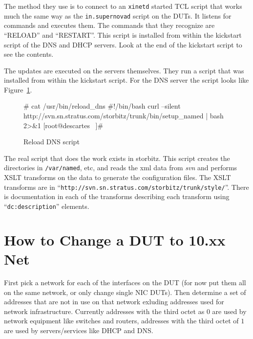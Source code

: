 \documentclass[twoside]{article}
\begin{document}
The method they use is to connect to an \verb+xinetd+ started TCL
script that works much the same way as the \verb+in.supernovad+ 
script on the DUTs.
It listens for commands and executes them.  The commands that
they recognize are ``RELOAD'' and ``RESTART''.
This script is installed from within the kickstart script of
the DNS and DHCP servers.
Look at the end of the kickstart script to see the contents.

The updates are executed on the servers themselves.
They run a script that was installed from within the kickstart script.
For the DNS server the script looks like Figure~\ref{script:reload:dns}.

\begin{figure}[!h]
\begin{center}
\begin{small}
\begin{boxedverbatim}
# cat /usr/bin/reload_dns 
#!/bin/bash
curl --silent http://svn.sn.stratus.com/storbitz/trunk/bin/setup_named | bash 2>&1
[root@descartes ~]# 
\end{boxedverbatim}
\end{small}
\end{center}
\caption{Reload DNS script}\label{script:reload:dns}
\end{figure}

The real script that does the work exists in storbitz.
This script creates the directories in \verb+/var/named+, etc, and
reads the xml data from {\em svn} and performs XSLT transforms on the
data to generate the configuration files.
The XSLT transforms are in ``\verb+http://svn.sn.stratus.com/storbitz/trunk/style/+''.
There is documentation in each of the transforms describing each transform
using ``\verb+dc:description+'' elements.

\section{How to Change a DUT to 10.xx Net}

First pick a network for each of the interfaces on the DUT
(for now put them all on the same network, or only change single NIC DUTs).
Then determine a set of addresses that are not in use on that network
exluding addresses used for network infrastructure.
Currently addresses with the third octet as $0$ are used by network
equipment like switches and routers, addresses with the third octet
of $1$ are used by servers/services like DHCP and DNS.
\end{document}
